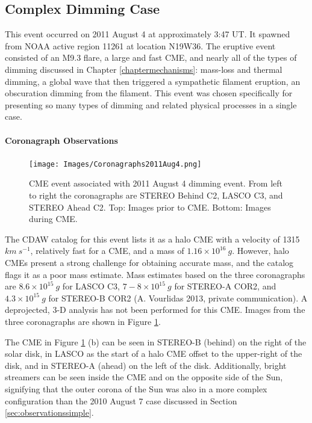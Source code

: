 \subsection{Complex Dimming Case}
This event occurred on 2011 August 4 at approximately 3:47 UT. It spawned from NOAA active region 11261 at location N19W36. The eruptive event consisted of an M9.3 flare, a large and fast CME, and nearly all of the types of dimming discussed in Chapter \ref{chaptermechanisms}: mass-loss and thermal dimming, a global wave that then triggered a sympathetic filament eruption, an obscuration dimming from the filament. This event was chosen specifically for presenting so many types of dimming and related physical processes in a single case. 

\paragraph{Coronagraph Observations}

\begin{figure}[!h]
    \begin{center}
	    \texttt{[image: Images/Coronagraphs2011Aug4.png]}
    \end{center}
    \caption[LASCO and STEREO coronagraph data for 2011 August 4 event]{ 
        CME event associated with 2011 August 4 dimming event. From left to right the coronagraphs are STEREO Behind C2, 
        LASCO C3, and STEREO Ahead C2. Top: Images prior to CME. Bottom: Images during CME. 
    }
    \label{coronagraphs2011aug4}
\end{figure}

The CDAW catalog for this event lists it as a halo CME with a velocity of 1315 $km\ s^{-1}$, relatively fast for a CME, and a mass of $1.16 \times 10^{16}\ g$. However, halo CMEs present a strong challenge for obtaining accurate mass, and the catalog flags it as a poor mass estimate. Mass estimates based on the three coronagraphs are $8.6 \times 10^{15}\ g$ for LASCO C3, $7-8 \times 10^{15}\ g$ for STEREO-A COR2, and $4.3 \times 10^{15}\ g$ for STEREO-B COR2 (A. Vourlidas 2013, private communication). A deprojected, 3-D analysis has not been performed for this CME. Images from the three coronagraphs are shown in Figure \ref{coronagraphs2011aug4}. 

The CME in Figure \ref{coronagraphs2011aug4} (b) can be seen in STEREO-B (behind) on the right of the solar disk, in LASCO as the start of a halo CME offset to the upper-right of the disk, and in STEREO-A (ahead) on the left of the disk. Additionally, bright streamers can be seen inside the CME and on the opposite side of the Sun, signifying that the outer corona of the Sun was also in a more complex configuration than the 2010 August 7 case discussed in Section \ref{sec:observationssimple}. 

